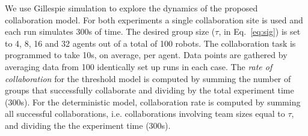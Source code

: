 \documentclass{svmult}  %
\begin{document}
We use Gillespie simulation \cite{gillespie76} to explore the dynamics of the proposed collaboration model.
For both experiments a single collaboration site is used and each run simulates 300s of time. The desired group size ($\tau$, in Eq.~\eqref{eq:sig}) is set to 4, 8, 16 and 32 agents out of a total of 100 robots. The collaboration task is programmed to take 10s, on average, per agent. Data points are gathered by averaging data from 100 identically set up runs in each case. The \emph{rate of collaboration} for the threshold model is computed by summing the number of groups that successfully collaborate and dividing by the total experiment time (300s). For the deterministic model, collaboration rate is computed by summing all successful collaborations, i.e. collaborations involving team sizes equal to $\tau$, and dividing the the experiment time (300s).


\end{document}
